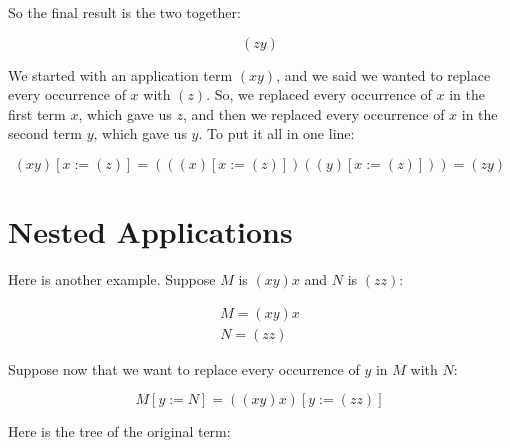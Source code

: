 \documentclass{book}
\numberwithin{equation}{chapter}
\begin{document}
\noindent
So the final result is the two together:

\begin{equation}
(z y)
\end{equation}

\noindent
We started with an application term $(x y)$, and we said we wanted to replace every occurrence of $x$ with $(z)$. So, we replaced every occurrence of $x$ in the first term $x$, which gave us $z$, and then we replaced every occurrence of $x$ in the second term $y$, which gave us $y$. To put it all in one line:

\begin{equation}
(x y)[x := (z)] = (((x)[x := (z)])((y)[x := (z)])) = (z y)
\end{equation}


\section{Nested Applications}

Here is another example. Suppose $M$ is $(x y) x$ and $N$ is $(z z)$:

\begin{align}
M = (x y) x \\
N = (z z)
\end{align}

\noindent
Suppose now that we want to replace every occurrence of $y$ in $M$ with $N$:

\begin{equation}
M[y := N] = ((x y) x)[y := (z z)]
\end{equation}

\noindent
Here is the tree of the original term:

\begin{center}
\end{center}
\end{document}

